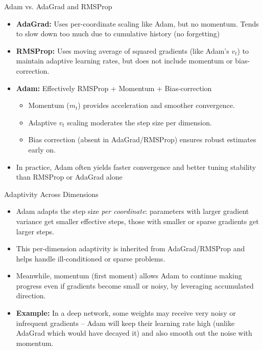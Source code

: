 \documentclass{beamer}
\begin{document}
\begin{frame}{Adam vs. AdaGrad and RMSProp}
  \begin{itemize}
    \item \textbf{AdaGrad:} Uses per-coordinate scaling like Adam, but no momentum. Tends to slow down too much due to cumulative history (no forgetting)
    \item \textbf{RMSProp:} Uses moving average of squared gradients (like Adam’s $v_t$) to maintain adaptive learning rates, but does not include momentum or bias-correction.
    \item \textbf{Adam:} Effectively RMSProp + Momentum + Bias-correction
    \begin{itemize}
      \item Momentum ($m_t$) provides acceleration and smoother convergence.
      \item Adaptive $v_t$ scaling moderates the step size per dimension.
      \item Bias correction (absent in AdaGrad/RMSProp) ensures robust estimates early on.
    \end{itemize}
    \item In practice, Adam often yields faster convergence and better tuning stability than RMSProp or AdaGrad alone
  \end{itemize}
\end{frame}


\begin{frame}{Adaptivity Across Dimensions}
  \begin{itemize}
    \item Adam adapts the step size \emph{per coordinate}: parameters with larger gradient variance get smaller effective steps, those with smaller or sparse gradients get larger steps.
    \item This per-dimension adaptivity is inherited from AdaGrad/RMSProp and helps handle ill-conditioned or sparse problems.
    \item Meanwhile, momentum (first moment) allows Adam to continue making progress even if gradients become small or noisy, by leveraging accumulated direction.
    \item \textbf{Example:} In a deep network, some weights may receive very noisy or infrequent gradients – Adam will keep their learning rate high (unlike AdaGrad which would have decayed it) and also smooth out the noise with momentum.
  \end{itemize}
\end{frame}
\end{document}
